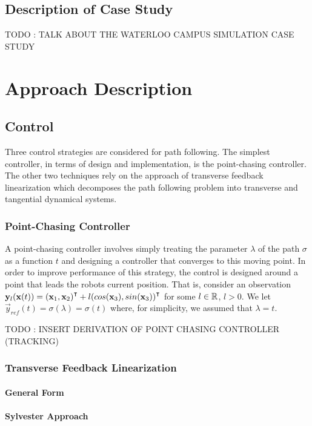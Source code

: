 \documentclass[oneside, 11pt]{book}
\begin{document}
\section{Description of Case Study}

TODO : TALK ABOUT THE WATERLOO CAMPUS SIMULATION CASE STUDY

\chapter{Approach Description}

\section{Control}\label{sec:control}
Three control strategies are considered for path following. The simplest controller, in terms of design and implementation, is the point-chasing controller. The other two techniques rely on the approach of transverse feedback linearization which decomposes the path following problem into transverse and tangential dynamical systems.

\subsection{Point-Chasing Controller}
A point-chasing controller involves simply treating the parameter $\lambda$ of the path $\sigma$ as a function $t$ and designing a controller that converges to this moving point. In order to improve performance of this strategy, the control is designed around a point that leads the robots current position. That is, consider an observation $\mathbf{y}_l(\mathbf{x}(t)) = {(\mathbf{x}_1, \mathbf{x}_2)}^{\intercal} + l{(cos(\mathbf{x}_3),sin(\mathbf{x}_3))}^{\intercal}$ for some $l\in\mathbb{R}$, $l>0$. We let $\vec{y}_{ref}(t) = \sigma(\lambda) = \sigma(t)$ where, for simplicity, we assumed that $\lambda = t$.

TODO : INSERT DERIVATION OF POINT CHASING CONTROLLER (TRACKING)

\subsection{Transverse Feedback Linearization}

\subsubsection{General Form}

\subsubsection{Sylvester Approach}
\end{document}
